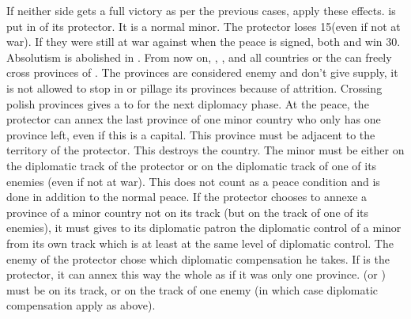 \begin{digressions}
  \label{pVI:WoPS:Status quo}
  \aparag If neither side gets a full victory as per the previous cases, apply
  these effects.
  \aparag \payspologne is put in \EG of its protector. It is a normal minor.
  \aparag The protector loses 15\VP (even if not at war).
  \aparag If they were still at war against \payspologne when the peace is
  signed, both \RUS and \AUS win 30\VP.
  \aparag Absolutism is abolished in \payspologne.
  \aparag From now on, \RUS, \AUS, \PRU and all countries or the \HRE can
  freely cross provinces of \payspologne. The provinces are considered enemy
  and don't give supply, it is not allowed to stop in \payspologne or pillage
  its provinces because of attrition.
  \bparag Crossing polish provinces gives a \CB to \payspologne for the next
  diplomacy phase.
  \aparag At the peace, the protector can annex the last province of one minor
  country who only has one province left, even if this is a capital.
  \bparag This province must be adjacent to the territory of the protector.
  \bparag This destroys the country.
  \bparag The minor must be either on the diplomatic track of the protector or
  on the diplomatic track of one of its enemies (even if not at war).
  \bparag This does not count as a peace condition and is done in addition to
  the normal peace.
  \bparag If the protector chooses to annexe a province of a minor country not
  on its track (but on the track of one of its enemies), it must gives to its
  diplomatic patron the diplomatic control of a minor from its own track which
  is at least at the same level of diplomatic control. The enemy of the
  protector chose which diplomatic compensation he takes.
  \bparag If \SUE is the protector, it can annex this way the whole
  \regionNorvege as if it was only one province. \paysdanemark (or
  \paysVnorvege) must be on its track, or on the track of one enemy (in which
  case diplomatic compensation apply as above).

\end{digressions}
